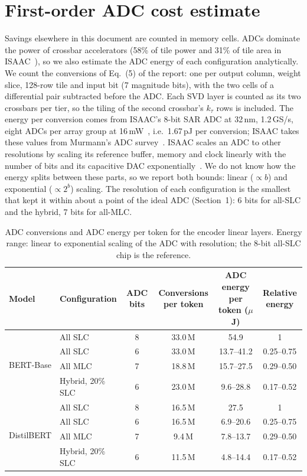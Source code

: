 \documentclass[10pt,a4paper]{article}
\begin{document}
\section{First-order ADC cost estimate}
Savings elsewhere in this document are counted in memory cells. ADCs dominate the power of crossbar
accelerators (58\% of tile power and 31\% of tile area in ISAAC~\cite{isaac}), so we also estimate the ADC
energy of each configuration analytically. We count the conversions of Eq.~(5) of the report: one per output
column, weight slice, 128-row tile and input bit (7 magnitude bits), with the two cells of a differential pair
subtracted before the ADC. Each SVD layer is counted as its two crossbars per tier, so the tiling of the
second crossbar's $k_\tau$ rows is included. The energy per conversion comes from ISAAC's 8-bit SAR ADC at
32\,nm, 1.2\,GS/s, eight ADCs per array group at 16\,mW~\cite{isaac}, i.e.\ 1.67\,pJ per conversion; ISAAC
takes these values from Murmann's ADC survey~\cite{murmann}. ISAAC scales an ADC to other resolutions by
scaling its reference buffer, memory and clock linearly with the number of bits and its capacitive DAC
exponentially~\cite{isaac}. We do not know how the energy splits between these parts, so we report both
bounds: linear ($\propto b$) and exponential ($\propto 2^b$) scaling. The resolution of each configuration is
the smallest that kept it within about a point of the ideal ADC (Section~1): 6 bits for all-SLC and the
hybrid, 7 bits for all-MLC.

\begin{table}[H]
\centering\small
\caption{ADC conversions and ADC energy per token for the encoder linear layers. Energy range: linear to
exponential scaling of the ADC with resolution; the 8-bit all-SLC chip is the reference.}
\begin{tabular}{@{}llcccc@{}}
\toprule
Model & Configuration & ADC bits & Conversions per token & ADC energy per token ($\mu$J) & Relative energy \\
\midrule
\multirow{4}{*}{BERT-Base} & All SLC & 8 & 33.0\,M & 54.9 & 1 \\
 & All SLC & 6 & 33.0\,M & 13.7--41.2 & 0.25--0.75 \\
 & All MLC & 7 & 18.8\,M & 15.7--27.5 & 0.29--0.50 \\
 & Hybrid, 20\% SLC & 6 & 23.0\,M & \phantom{0}9.6--28.8 & 0.17--0.52 \\
\midrule
\multirow{4}{*}{DistilBERT} & All SLC & 8 & 16.5\,M & 27.5 & 1 \\
 & All SLC & 6 & 16.5\,M & \phantom{0}6.9--20.6 & 0.25--0.75 \\
 & All MLC & 7 & \phantom{0}9.4\,M & \phantom{0}7.8--13.7 & 0.29--0.50 \\
 & Hybrid, 20\% SLC & 6 & 11.5\,M & \phantom{0}4.8--14.4 & 0.17--0.52 \\
\bottomrule
\end{tabular}
\end{table}
\end{document}
